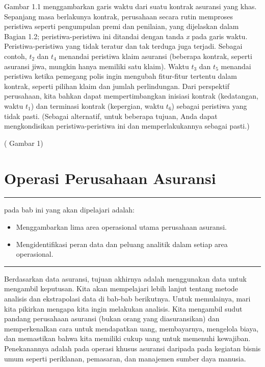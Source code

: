 \documentclass[
]{book}
\providecommand{\tightlist}{%
  \setlength{\itemsep}{0pt}\setlength{\parskip}{0pt}}
\begin{document}
Gambar 1.1 menggambarkan garis waktu dari suatu kontrak asuransi yang khas. Sepanjang masa berlakunya kontrak, perusahaan secara rutin memproses peristiwa seperti pengumpulan premi dan penilaian, yang dijelaskan dalam Bagian 1.2; peristiwa-peristiwa ini ditandai dengan tanda \emph{x} pada garis waktu. Peristiwa-peristiwa yang tidak teratur dan tak terduga juga terjadi. Sebagai contoh, \(t_2\) dan \(t_4\) menandai peristiwa klaim asuransi (beberapa kontrak, seperti asuransi jiwa, mungkin hanya memiliki satu klaim). Waktu \(t_3\) dan \(t_5\) menandai peristiwa ketika pemegang polis ingin mengubah fitur-fitur tertentu dalam kontrak, seperti pilihan klaim dan jumlah perlindungan. Dari perspektif perusahaan, kita bahkan dapat mempertimbangkan inisiasi kontrak (kedatangan, waktu \(t_1\)) dan terminasi kontrak (kepergian, waktu \(t_6\)) sebagai peristiwa yang tidak pasti. (Sebagai alternatif, untuk beberapa tujuan, Anda dapat mengkondisikan peristiwa-peristiwa ini dan memperlakukannya sebagai pasti.)

( Gambar 1)

\hypertarget{operasi-perusahaan-asuransi}{%
\section{Operasi Perusahaan Asuransi}\label{operasi-perusahaan-asuransi}}

\begin{center}\rule{0.5\linewidth}{0.5pt}\end{center}

pada bab ini yang akan dipelajari adalah:

\begin{itemize}
\tightlist
\item
  Menggambarkan lima area operasional utama perusahaan asuransi.
\item
  Mengidentifikasi peran data dan peluang analitik dalam setiap area operasional.
\end{itemize}

\begin{center}\rule{0.5\linewidth}{0.5pt}\end{center}

Berdasarkan data asuransi, tujuan akhirnya adalah menggunakan data untuk mengambil keputusan. Kita akan mempelajari lebih lanjut tentang metode analisis dan ekstrapolasi data di bab-bab berikutnya. Untuk memulainya, mari kita pikirkan mengapa kita ingin melakukan analisis. Kita mengambil sudut pandang perusahaan asuransi (bukan orang yang diasuransikan) dan memperkenalkan cara untuk mendapatkan uang, membayarnya, mengelola biaya, dan memastikan bahwa kita memiliki cukup uang untuk memenuhi kewajiban. Penekanannya adalah pada operasi khusus asuransi daripada pada kegiatan bisnis umum seperti periklanan, pemasaran, dan manajemen sumber daya manusia.
\end{document}
